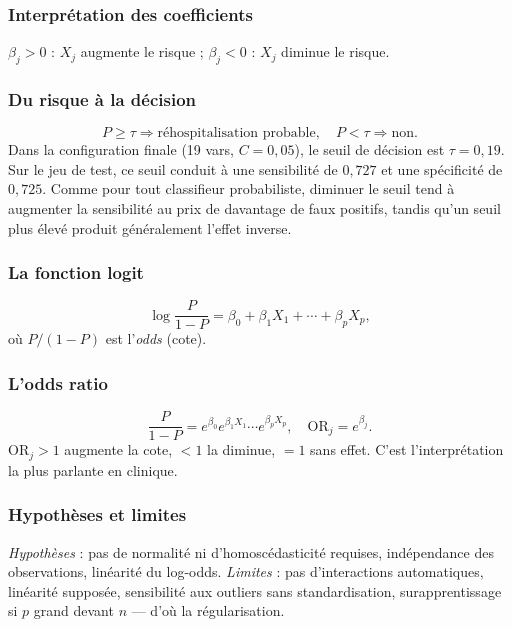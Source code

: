 \documentclass[12pt,a4paper]{report}
\begin{document}
\subsubsection{Interprétation des coefficients}

$\beta_j>0$ : $X_j$ augmente le risque ; $\beta_j<0$ : $X_j$ diminue le risque.

\subsubsection{Du risque à la décision}

\begin{equation}
 P \ge \tau \Rightarrow \text{réhospitalisation probable},\quad
 P < \tau \Rightarrow \text{non}.
\end{equation}
Dans la configuration finale (19 vars, $C=0{,}05$), le seuil de décision est $\tau=0{,}19$. Sur le jeu de
test, ce seuil conduit à une sensibilité de $0{,}727$ et une spécificité de $0{,}725$.
Comme pour tout classifieur probabiliste, diminuer le seuil tend à augmenter la sensibilité
au prix de davantage de faux positifs, tandis qu'un seuil plus élevé produit généralement
l'effet inverse.

\subsubsection{La fonction logit}

\begin{equation}
 \log\frac{P}{1-P}= \beta_0+\beta_1 X_1+\cdots+\beta_p X_p,
\end{equation}
où $P/(1-P)$ est l'\emph{odds} (cote).

\subsubsection{L'odds ratio}

\begin{equation}
 \frac{P}{1-P}= e^{\beta_0} e^{\beta_1 X_1}\cdots e^{\beta_p X_p},\quad
 \text{OR}_j = e^{\beta_j}.
\end{equation}
$\text{OR}_j>1$ augmente la cote, $<1$ la diminue, $=1$ sans effet. C'est l'interprétation
la plus parlante en clinique.

\subsubsection{Hypothèses et limites}

\emph{Hypothèses} : pas de normalité ni d'homoscédasticité requises, indépendance des
observations, linéarité du log-odds. \emph{Limites} : pas d'interactions automatiques,
linéarité supposée, sensibilité aux outliers sans standardisation, surapprentissage si
$p$ grand devant $n$ — d'où la régularisation.
\end{document}
